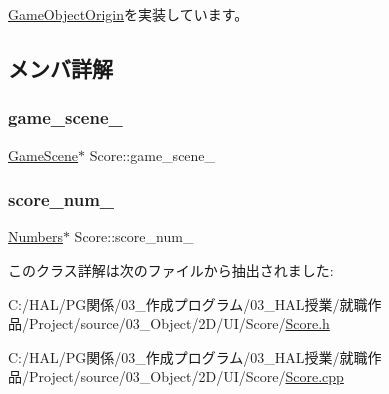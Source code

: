 \mbox{\hyperlink{class_game_object_origin_aeac8fc4a1f625982313a9a60dd35d016}{Game\+Object\+Origin}}を実装しています。



\subsection{メンバ詳解}
\mbox{\label{class_score_ada5a957b01fbed0c1bb52cea4e1bcbc4}} 
\subsubsection{\texorpdfstring{game\+\_\+scene\+\_\+}{game\_scene\_}}
{\footnotesize\ttfamily \mbox{\hyperlink{class_game_scene}{Game\+Scene}}$\ast$ Score\+::game\+\_\+scene\+\_\+}

\mbox{\label{class_score_a5d178c5581627f1fa4c06f95f9558dcd}} 
\subsubsection{\texorpdfstring{score\+\_\+num\+\_\+}{score\_num\_}}
{\footnotesize\ttfamily \mbox{\hyperlink{class_numbers}{Numbers}}$\ast$ Score\+::score\+\_\+num\+\_\+}



このクラス詳解は次のファイルから抽出されました\+:\begin{DoxyCompactItemize}
\item 
C\+:/\+H\+A\+L/\+P\+G関係/03\+\_\+作成プログラム/03\+\_\+\+H\+A\+L授業/就職作品/\+Project/source/03\+\_\+\+Object/2\+D/\+U\+I/\+Score/\mbox{\hyperlink{_score_8h}{Score.\+h}}\item 
C\+:/\+H\+A\+L/\+P\+G関係/03\+\_\+作成プログラム/03\+\_\+\+H\+A\+L授業/就職作品/\+Project/source/03\+\_\+\+Object/2\+D/\+U\+I/\+Score/\mbox{\hyperlink{_score_8cpp}{Score.\+cpp}}\end{DoxyCompactItemize}
